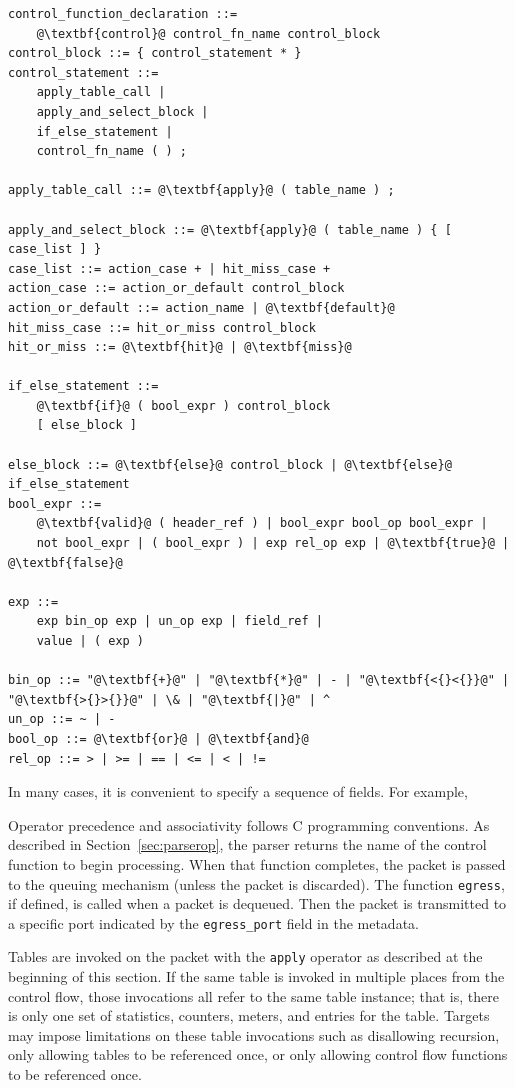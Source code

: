 \documentclass[12pt]{article}
\begin{document}
\begin{lstlisting}[frame=single,backgroundcolor=\color{bnfgreen},escapechar=\@]
control_function_declaration ::=
    @\textbf{control}@ control_fn_name control_block
control_block ::= { control_statement * }
control_statement ::= 
    apply_table_call |
    apply_and_select_block |
    if_else_statement |
    control_fn_name ( ) ;

apply_table_call ::= @\textbf{apply}@ ( table_name ) ;

apply_and_select_block ::= @\textbf{apply}@ ( table_name ) { [ case_list ] }
case_list ::= action_case + | hit_miss_case +
action_case ::= action_or_default control_block
action_or_default ::= action_name | @\textbf{default}@
hit_miss_case ::= hit_or_miss control_block
hit_or_miss ::= @\textbf{hit}@ | @\textbf{miss}@

if_else_statement ::=
    @\textbf{if}@ ( bool_expr ) control_block
    [ else_block ]

else_block ::= @\textbf{else}@ control_block | @\textbf{else}@ if_else_statement
bool_expr ::=
    @\textbf{valid}@ ( header_ref ) | bool_expr bool_op bool_expr |
    not bool_expr | ( bool_expr ) | exp rel_op exp | @\textbf{true}@ | @\textbf{false}@

exp ::=
    exp bin_op exp | un_op exp | field_ref |
    value | ( exp )

bin_op ::= "@\textbf{+}@" | "@\textbf{*}@" | - | "@\textbf{<{}<{}}@" | "@\textbf{>{}>{}}@" | \& | "@\textbf{|}@" | ^
un_op ::= ~ | -
bool_op ::= @\textbf{or}@ | @\textbf{and}@
rel_op ::= > | >= | == | <= | < | !=
\end{lstlisting}

In many cases, it is convenient to specify a sequence of fields. For example, 

Operator precedence and associativity follows C programming conventions.
As described in Section~\ref{sec:parserop}, the parser returns the name 
of the control function to begin \matchaction processing.  When that function 
completes, the packet is passed to the queuing mechanism (unless the packet 
is discarded).  The function \texttt{egress}, if defined, is called when a packet 
is dequeued. Then the packet is transmitted to a specific port indicated by 
the \texttt{egress_port} field in the metadata.

Tables are invoked on the packet with the \texttt{apply} operator as described at 
the beginning of this section. If the same table is invoked in multiple places 
from the control flow, those invocations all refer to the same table instance; 
that is, there is only one set of statistics, counters, meters, and \matchaction 
entries for the table. Targets may impose limitations on these table invocations 
such as disallowing recursion, only allowing tables to be referenced once, 
or only allowing control flow functions to be referenced once.
\end{document}

